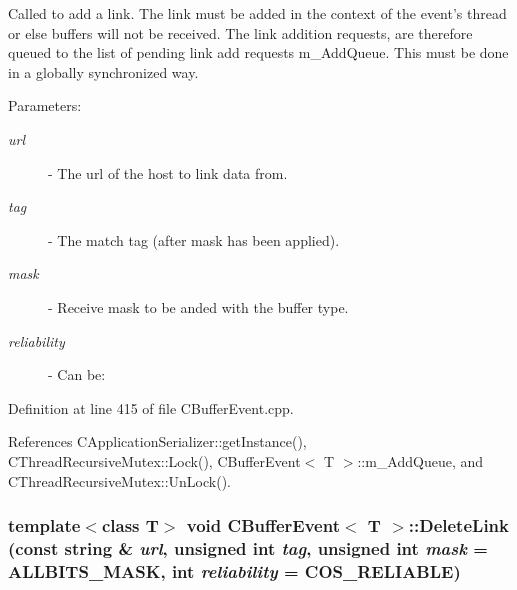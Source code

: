 Called to add a link. The link must be added in the context of the event's thread or else buffers will not be received. The link addition requests, are therefore queued to the list of pending link add requests m\_\-Add\-Queue. This must be done in a globally synchronized way. \begin{Desc}
\item[Parameters: ]\par
\begin{description}
\item[{\em 
url}]- The url of the host to link data from. \item[{\em 
tag}]- The match tag (after mask has been applied). \item[{\em 
mask}]- Receive mask to be anded with the buffer type. \item[{\em 
reliability}]- Can be:
\end{description}
\end{Desc}


Definition at line 415 of file CBuffer\-Event.cpp.

References CApplication\-Serializer::get\-Instance(), CThread\-Recursive\-Mutex::Lock(), CBuffer\-Event$<$ T $>$::m\_\-Add\-Queue, and CThread\-Recursive\-Mutex::Un\-Lock().
\subsubsection{\setlength{\rightskip}{0pt plus 5cm}template$<$class T$>$ void CBuffer\-Event$<$ T $>$::Delete\-Link (const string \& {\em url}, unsigned int {\em tag}, unsigned int {\em mask} = ALLBITS\_\-MASK, int {\em reliability} = COS\_\-RELIABLE)}\label{classCBufferEvent_a9}


